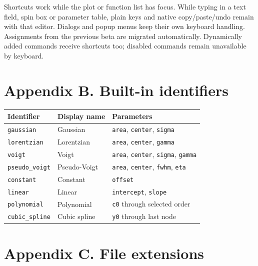 \documentclass[
  10pt,
  a4paper,
  oneside]{scrreprt}
\begin{document}
Shortcuts work while the plot or function list has focus. While typing
in a text field, spin box or parameter table, plain keys and native
copy/paste/undo remain with that editor. Dialogs and popup menus keep
their own keyboard handling. Assignments from the previous beta are
migrated automatically. Dynamically added commands receive shortcuts
too; disabled commands remain unavailable by keyboard.

\hypertarget{appendix-b.-built-in-identifiers}{%
\chapter{Appendix B. Built-in
identifiers}\label{appendix-b.-built-in-identifiers}}

\begin{longtable}[]{@{}lll@{}}
\toprule
Identifier & Display name & Parameters\tabularnewline
\midrule
\endhead
\texttt{gaussian} & Gaussian & \texttt{area}, \texttt{center},
\texttt{sigma}\tabularnewline
\texttt{lorentzian} & Lorentzian & \texttt{area}, \texttt{center},
\texttt{gamma}\tabularnewline
\texttt{voigt} & Voigt & \texttt{area}, \texttt{center}, \texttt{sigma},
\texttt{gamma}\tabularnewline
\texttt{pseudo\_voigt} & Pseudo-Voigt & \texttt{area}, \texttt{center},
\texttt{fwhm}, \texttt{eta}\tabularnewline
\texttt{constant} & Constant & \texttt{offset}\tabularnewline
\texttt{linear} & Linear & \texttt{intercept},
\texttt{slope}\tabularnewline
\texttt{polynomial} & Polynomial & \texttt{c0} through selected
order\tabularnewline
\texttt{cubic\_spline} & Cubic spline & \texttt{y0} through last
node\tabularnewline
\bottomrule
\end{longtable}

\hypertarget{appendix-c.-file-extensions}{%
\chapter{Appendix C. File
extensions}\label{appendix-c.-file-extensions}}
\end{document}

